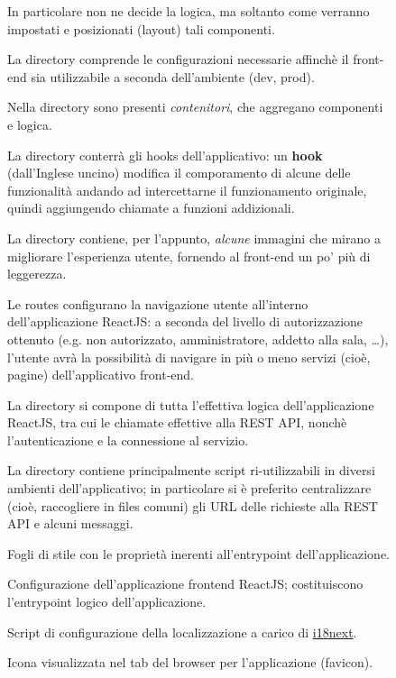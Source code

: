 \begin{figure}[h]
\begin{minipage}[t]{0.70\textwidth}
\begin{description}[leftmargin=!,labelwidth=\widthof{\bfseries components},font=\color{ddchaptercolor!70!black}]
					In particolare non ne decide la logica, ma soltanto come verranno impostati e posizionati (layout) tali componenti.
					\sepline
				\item[config] La directory comprende le configurazioni necessarie affinchè il front-end sia utilizzabile
					a seconda dell'ambiente (dev, prod).
					\sepline
				\item[containers] Nella directory sono presenti \textit{contenitori}, che aggregano componenti e logica.
					\sepline
				\item[hooks] La directory conterrà gli hooks dell'applicativo: un \textbf{hook}	(dall'Inglese uncino) modifica il comporamento di alcune delle funzionalità
				andando ad intercettarne il funzionamento originale, quindi aggiungendo chiamate a funzioni addizionali.
					\sepline
				\item[images] La directory contiene, per l'appunto, \textit{alcune} immagini che mirano a migliorare
				l'esperienza utente, fornendo al front-end un po' più di leggerezza.
					\sepline
				\item[routes] Le routes configurano la navigazione utente all'interno dell'applicazione ReactJS: a seconda
				del livello di autorizzazione ottenuto (e.g. non autorizzato, amministratore, addetto alla sala, \dots),
				l'utente avrà la possibilità di navigare in più o meno servizi (cioè, pagine) dell'applicativo front-end.
					\sepline
				\item[services] La directory si compone di tutta l'effettiva logica dell'applicazione ReactJS, tra cui
				le chiamate effettive alla REST API, nonchè l'autenticazione e la connessione al servizio.
					\sepline
				\item[utilities] La directory contiene principalmente script ri-utilizzabili in diversi ambienti 
				dell'applicativo; in particolare si è preferito centralizzare (cioè, raccogliere in files comuni)
				gli URL delle richieste alla REST API e alcuni messaggi.
					\sepline
				\item[App.css, Index.css] Fogli di stile con le proprietà inerenti all'entrypoint dell'applicazione.
				\item[App.js, Index.js] Configurazione dell'applicazione frontend ReactJS; costituiscono l'entrypoint logico dell'applicazione.
					\sepline
				\item[i18n.js] Script di configurazione della localizzazione a carico di \href{https://www.i18next.com/}{i18next}.
					\sepline
				\item[logo.svg] Icona visualizzata nel tab del browser per l'applicazione (favicon).
			\end{description}
		\end{minipage}\hfill\null
	\end{figure}
	
